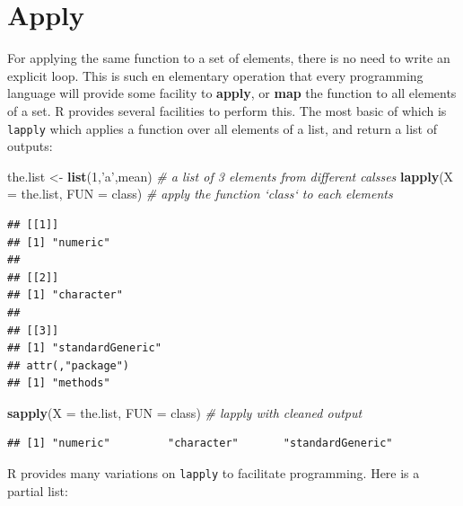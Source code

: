 \documentclass[]{book}
\newenvironment{Shaded}{\begin{snugshade}}{\end{snugshade}}
\newcommand{\KeywordTok}[1]{\textcolor[rgb]{0.13,0.29,0.53}{\textbf{#1}}}
\newcommand{\DataTypeTok}[1]{\textcolor[rgb]{0.13,0.29,0.53}{#1}}
\newcommand{\DecValTok}[1]{\textcolor[rgb]{0.00,0.00,0.81}{#1}}
\newcommand{\StringTok}[1]{\textcolor[rgb]{0.31,0.60,0.02}{#1}}
\newcommand{\CommentTok}[1]{\textcolor[rgb]{0.56,0.35,0.01}{\textit{#1}}}
\newcommand{\NormalTok}[1]{#1}
\theoremstyle{definition}
\theoremstyle{definition}
\theoremstyle{definition}
\theoremstyle{remark}
\begin{document}
\section{Apply}\label{apply}

For applying the same function to a set of elements, there is no need to
write an explicit loop. This is such en elementary operation that every
programming language will provide some facility to \textbf{apply}, or
\textbf{map} the function to all elements of a set. R provides several
facilities to perform this. The most basic of which is \texttt{lapply}
which applies a function over all elements of a list, and return a list
of outputs:

\begin{Shaded}
\begin{Highlighting}[]
\NormalTok{the.list <-}\StringTok{ }\KeywordTok{list}\NormalTok{(}\DecValTok{1}\NormalTok{,}\StringTok{'a'}\NormalTok{,mean) }\CommentTok{# a list of 3 elements from different calsses}
\KeywordTok{lapply}\NormalTok{(}\DataTypeTok{X =}\NormalTok{ the.list, }\DataTypeTok{FUN =}\NormalTok{ class) }\CommentTok{# apply the function `class` to each elements}
\end{Highlighting}
\end{Shaded}

\begin{verbatim}
## [[1]]
## [1] "numeric"
## 
## [[2]]
## [1] "character"
## 
## [[3]]
## [1] "standardGeneric"
## attr(,"package")
## [1] "methods"
\end{verbatim}

\begin{Shaded}
\begin{Highlighting}[]
\KeywordTok{sapply}\NormalTok{(}\DataTypeTok{X =}\NormalTok{ the.list, }\DataTypeTok{FUN =}\NormalTok{ class) }\CommentTok{# lapply with cleaned output}
\end{Highlighting}
\end{Shaded}

\begin{verbatim}
## [1] "numeric"         "character"       "standardGeneric"
\end{verbatim}

R provides many variations on \texttt{lapply} to facilitate programming.
Here is a partial list:
\end{document}
